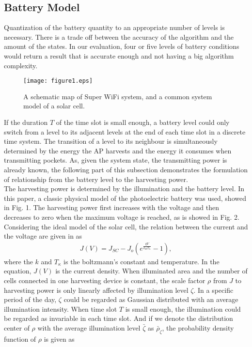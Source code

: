 \documentclass[conference]{IEEEtran}
\begin{document}
\subsection{Battery Model}
\indent Quantization of the battery quantity to an appropriate number of levels is necessary. There is a trade off between the accuracy of the algorithm and the amount of the states. In our evaluation, four or five levels of battery conditions would return a result that is accurate enough and not having a big algorithm complexity.\\
\begin{figure}[t]
\centering
\texttt{[image: figure1.eps]}\\
\caption{A schematic map of Super WiFi system, and a common system model of a solar cell.}
\end{figure}
\indent If the duration \(T\) of the time slot is small enough, a battery level could only switch from a level to its adjacent levels at the end of each time slot in a discrete time system. The transition of a level to its neighbour is simultaneously determined by the energy the AP harvests and the energy it consumes when transmitting pockets. As, given the system state, the transmitting power is already known, the following part of this subsection demonstrates the formulation of relationship from the battery level to the harvesting power.\\
\indent The harvesting power is determined by the illumination and the battery level. In this paper, a classic physical model of the photoelectric battery was used, showed in Fig. 1. The harvesting power first increases with the voltage and then decreases to zero when the maximum voltage is reached, as is showed in Fig. 2. Considering the ideal model of the solar cell, the relation between the current and the voltage are given in \cite{2} as
\begin{equation}
\begin{aligned}
J(V) = J_{SC} - J_o\left(e^{\frac{qV} {k_B T_\kappa}} - 1\right),
\end{aligned}
\end{equation}
where the \(k\) and \(T_\kappa\) is the boltzmann's constant and temperature. In the equation, \(J(V)\) is the current density. When illuminated area and the number of cells connected in one harvesting device is constant, the scale factor \(\rho\) from \(J\) to harvesting power is only linearly affected by illumination level \(\zeta\). In a specific period of the day, \(\zeta\) could be regarded as Gaussian distributed with an average illumination intensity. When time slot \(T\) is small enough, the illumination could be regarded as invariable in each time slot. And if we denote the distribution center of \(\rho\) with the average illumination level \(\bar{\zeta}\) as \(\bar{\rho}_\zeta\), the probability density function of \(\rho\) is given as
\end{document}

